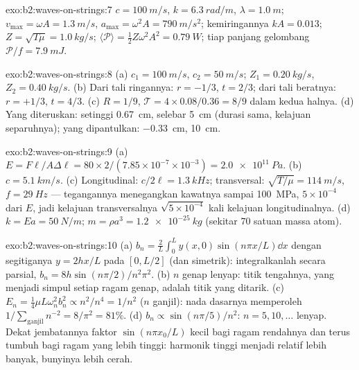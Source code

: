 \begin{solution}{exo:b2:waves-on-strings:7}
$c = \qty{100}{m/s}$, $k = \qty{6.3}{rad/m}$, $\lambda = \qty{1.0}{m}$; $v_{\max} = \omega A =
\qty{1.3}{m/s}$, $a_{\max} = \omega^2A = \qty{790}{m/s^2}$; kemiringannya $kA = 0.013$; $Z =
\sqrt{T\mu} = \qty{1.0}{kg/s}$; $\langle\mathcal P\rangle = \tfrac12Z\omega^2A^2 = \qty{0.79}{W}$;
tiap panjang gelombang $\mathcal P/f = \qty{7.9}{mJ}$.
\end{solution}

\begin{solution}{exo:b2:waves-on-strings:8}
(a) $c_1 = \qty{100}{m/s}$, $c_2 = \qty{50}{m/s}$; $Z_1 = \qty{0.20}{kg/s}$, $Z_2 = \qty{0.40}{kg/s}$.
(b) Dari tali ringannya: $r = -1/3$, $t = 2/3$; dari tali beratnya: $r =
+1/3$, $t = 4/3$. (c) $R = 1/9$, $\mathcal T = 4 \times 0.08/0.36 = 8/9$ dalam kedua halnya.
(d) Yang diteruskan: setinggi \qty{0.67}{cm}, selebar \qty{5}{cm} (durasi sama, kelajuan
separuhnya); yang dipantulkan: \qty{-0.33}{cm}, \qty{10}{cm}.
\end{solution}

\begin{solution}{exo:b2:waves-on-strings:9}
(a) $E = F\ell/A\Delta\ell = 80 \times 2/(7.85 \times 10^{-7} \times 10^{-3}) = \qty{2.0e11}{Pa}$.
(b) $c = \qty{5.1}{km/s}$. (c) Longitudinal: $c/2\ell = \qty{1.3}{kHz}$; transversal:
$\sqrt{T/\mu} = \qty{114}{m/s}$, $f = \qty{29}{Hz}$ --- tegangannya menegangkan
kawatnya sampai \qty{100}{MPa}, $5 \times 10^{-4}$ dari $E$, jadi kelajuan transversalnya
$\sqrt{5 \times 10^{-4}}$ kali kelajuan longitudinalnya. (d) $k = Ea = \qty{50}{N/m}$; $m
= \rho a^3 = \qty{1.2e-25}{kg}$ (sekitar $70$ satuan massa atom).
\end{solution}

\begin{solution}{exo:b2:waves-on-strings:10}
(a) $b_n = \frac2L\int_0^Ly(x, 0)\sin(n\pi x/L)\dd x$ dengan segitiganya $y =
2hx/L$ pada $[0, L/2]$ (dan simetrik): integralkanlah secara parsial, $b_n = 8h\sin(n\pi/2)
/n^2\pi^2$. (b) $n$ genap lenyap: titik tengahnya, yang menjadi simpul setiap ragam genap,
adalah titik yang ditarik. (c) $E_n = \tfrac14\mu L\omega_n^2b_n^2 \propto n^2/n^4 = 1/n^2$
($n$ ganjil): nada dasarnya memperoleh $1/\sum_{\text{ganjil}}n^{-2} = 8/\pi^2 = 81\%$. (d)
$b_n \propto \sin(n\pi/5)/n^2$: $n = 5, 10, \dots$ lenyap. Dekat jembatannya
faktor $\sin(n\pi x_0/L)$ kecil bagi ragam rendahnya dan terus tumbuh
bagi ragam yang lebih tinggi: harmonik tinggi menjadi relatif lebih banyak, bunyinya lebih cerah.
\end{solution}

